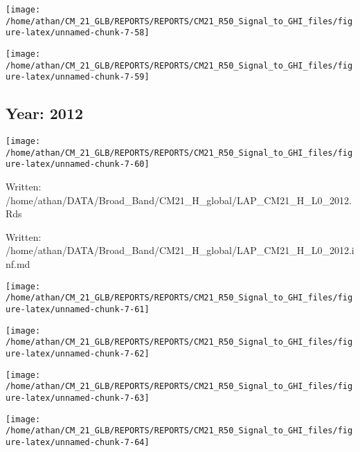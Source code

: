 \documentclass[
  11pt,
  a4paper,oneside]{article}
\begin{document}
\begin{center}\texttt{[image: /home/athan/CM\_21\_GLB/REPORTS/REPORTS/CM21\_R50\_Signal\_to\_GHI\_files/figure-latex/unnamed-chunk-7-58]} \end{center}

\begin{center}\texttt{[image: /home/athan/CM\_21\_GLB/REPORTS/REPORTS/CM21\_R50\_Signal\_to\_GHI\_files/figure-latex/unnamed-chunk-7-59]} \end{center}

\FloatBarrier

\newpage

\hypertarget{year-2012}{%
\subsection{Year: 2012}\label{year-2012}}

\begin{center}\texttt{[image: /home/athan/CM\_21\_GLB/REPORTS/REPORTS/CM21\_R50\_Signal\_to\_GHI\_files/figure-latex/unnamed-chunk-7-60]} \end{center}

Written: /home/athan/DATA/Broad\_Band/CM21\_H\_global/LAP\_CM21\_H\_L0\_2012.Rds

Written: /home/athan/DATA/Broad\_Band/CM21\_H\_global/LAP\_CM21\_H\_L0\_2012.inf.md

\begin{center}\texttt{[image: /home/athan/CM\_21\_GLB/REPORTS/REPORTS/CM21\_R50\_Signal\_to\_GHI\_files/figure-latex/unnamed-chunk-7-61]} \end{center}

\begin{center}\texttt{[image: /home/athan/CM\_21\_GLB/REPORTS/REPORTS/CM21\_R50\_Signal\_to\_GHI\_files/figure-latex/unnamed-chunk-7-62]} \end{center}

\begin{center}\texttt{[image: /home/athan/CM\_21\_GLB/REPORTS/REPORTS/CM21\_R50\_Signal\_to\_GHI\_files/figure-latex/unnamed-chunk-7-63]} \end{center}

\begin{center}\texttt{[image: /home/athan/CM\_21\_GLB/REPORTS/REPORTS/CM21\_R50\_Signal\_to\_GHI\_files/figure-latex/unnamed-chunk-7-64]} \end{center}
\end{document}
